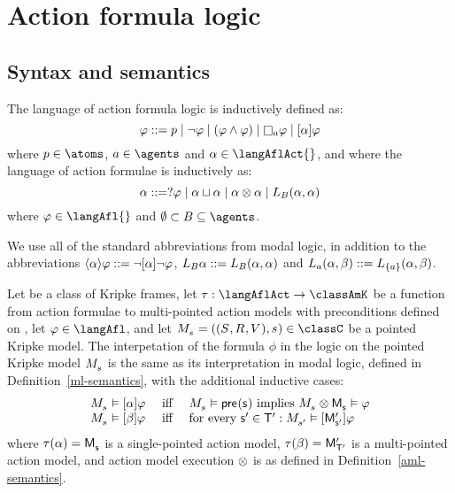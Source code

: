 \chapter{Action formula logic}

\section{Syntax and semantics}

\begin{definition}
The language \langAfl{} of action formula logic is inductively defined as:
$$
\phi ::= \atomP \mid 
       \neg \phi \mid
       (\phi \land \phi) \mid
       \necessaryA \phi \mid
       \actionA{\alpha} \phi
$$
where $\atomP \in \atoms$, $\agentA \in \agents$ and $\alpha \in \langAflAct{}$, and where the language \langAflAct{} of action formulae is inductively as:
$$
\alpha ::= \test{\phi} \mid
       \alpha \choice \alpha \mid
       \alpha \compose \alpha \mid
       \learnsBs (\alpha, \alpha)
$$
where $\phi \in \langAfl{}$ and $\emptyset \subset \agentsB \subseteq \agents$.
\end{definition}

We use all of the standard abbreviations from modal logic, in addition to the abbreviations $\actionE{\alpha} \phi ::= \lnot \actionA{\alpha} \lnot \phi$, $\learnsBs \alpha ::= \learnsBs (\alpha, \alpha)$ and $\learnsA (\alpha, \beta) ::= \learns[{\{\agentA\}}] (\alpha, \beta)$.

\begin{definition}
Let \classC{} be a class of Kripke frames, let $\tau : \langAflAct \to \classAmK$ be a function from action formulae to multi-pointed action models with preconditions defined on \langAfl{}, let $\phi \in \langAfl$, and let $\kPModelAndTuple{\kStateS} \in \classC$ be a pointed Kripke model.
The interpetation of the formula $\phi$ in the logic \logicAflC{} on the pointed Kripke model $\kPModel{\kStateS}$ is the same as its interpretation in modal logic, defined in Definition~\ref{ml-semantics}, with the additional inductive cases:
$$
\begin{array}{lcl}
    \kPModel{\kStateS} \entails \actionA{\alpha} \phi & \text { iff } & \kPModel{\kStateS} \entails \aPrecondition(\aStateS) \text{ implies } \kPModel{\kStateS} \exec \aPModel{\aStateS} \entails \phi\\
    \kPModel{\kStateS} \entails \actionA{\beta} \phi & \text { iff } & \text{for every } \aStateSP \in \aStatesTP: \kPModel{\kStateSP} \entails \actionA{\aPModelP{\aStateSP}} \phi
\end{array}
$$
where $\tau(\alpha) = \aPModel{\aStateS}$ is a single-pointed action model, $\tau(\beta) = \aPModelP{\aStatesTP}$ is a multi-pointed action model, and action model execution $\exec$ is as defined in Definition~\ref{aml-semantics}.
\end{definition}

